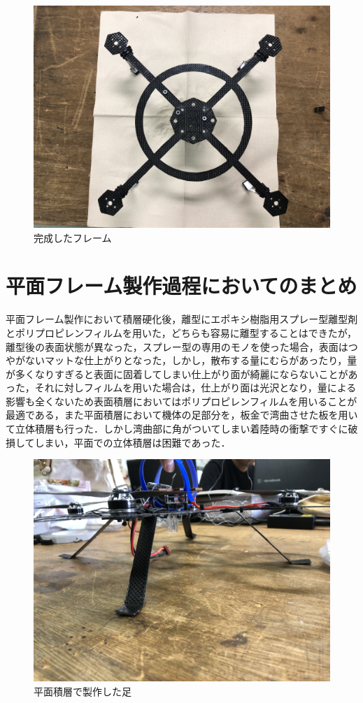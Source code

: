 \begin{figure}[htbp]
  \begin{center}
    \includegraphics[width=120mm]{img/２１.JPG}
    \end{center}
  \caption{完成したフレーム}
 \label{fig:robot}
\end{figure}

\section{平面フレーム製作過程においてのまとめ}
平面フレーム製作において積層硬化後，離型にエポキシ樹脂用スプレー型離型剤とポリプロピレンフィルムを用いた，どちらも容易に離型することはできたが，離型後の表面状態が異なった，スプレー型の専用のモノを使った場合，表面はつやがないマットな仕上がりとなった，しかし，散布する量にむらがあったり，量が多くなりすぎると表面に固着してしまい仕上がり面が綺麗にならないことがあった，それに対しフィルムを用いた場合は，仕上がり面は光沢となり，量による影響も全くないため表面積層においてはポリプロピレンフィルムを用いることが最適である，また平面積層において機体の足部分を，板金で湾曲させた板を用いて立体積層も行った．しかし湾曲部に角がついてしまい着陸時の衝撃ですぐに破損してしまい，平面での立体積層は困難であった．

\begin{figure}[htbp]
  \begin{center}
    \includegraphics[width=120mm]{img/２４.JPG}
    \end{center}
  \caption{平面積層で製作した足}
 \label{fig:robot}
\end{figure}


